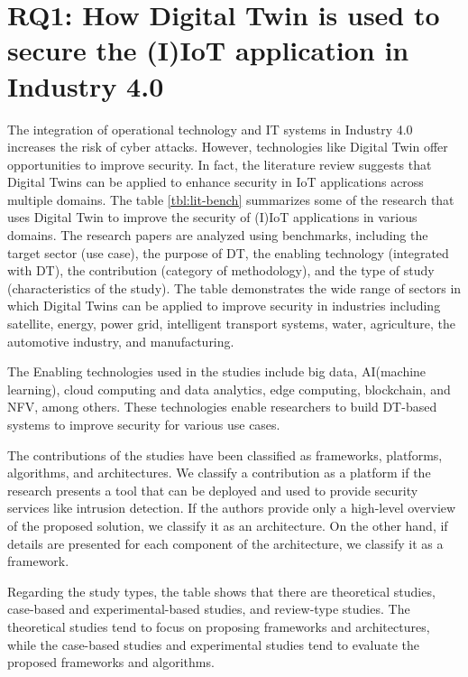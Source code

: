 %
%
\section{RQ1: How Digital Twin is used to secure the (I)IoT application in Industry 4.0}

The integration of operational technology and IT systems in Industry 4.0 increases the risk of cyber attacks. However, technologies like Digital Twin offer opportunities to improve security\cite{dietzHarnessingDigitalTwin2022}. In fact, the literature review suggests that Digital Twins can be applied to enhance security in IoT applications across multiple domains. The table \ref{tbl:lit-bench} summarizes some of the research that uses Digital Twin to improve the security of (I)IoT applications in various domains. The research papers are analyzed using benchmarks, including the target sector (use case), the purpose of DT, the enabling technology (integrated with DT), the contribution (category of methodology), and the type of study (characteristics of the study). The table demonstrates the wide range of sectors in which Digital Twins can be applied to improve security in industries including satellite, energy, power grid, intelligent transport systems, water, agriculture, the automotive industry, and manufacturing.

The Enabling technologies used in the studies include big data,  AI(machine learning), cloud computing and data analytics, edge computing, blockchain, and NFV, among others. These technologies enable researchers to build DT-based systems to improve security for various use cases.

The contributions of the studies have been classified as frameworks, platforms, algorithms, and architectures. We classify a contribution as a platform if the research presents a tool that can be deployed and used to provide security services like intrusion detection. If the authors provide only a high-level overview of the proposed solution, we classify it as an architecture. On the other hand, if details are presented for each component of the architecture, we classify it as a framework.

Regarding the study types, the table shows that there are theoretical studies, case-based and experimental-based studies, and review-type studies. The theoretical studies tend to focus on proposing frameworks and architectures, while the case-based studies and experimental studies tend to evaluate the proposed frameworks and algorithms. 

